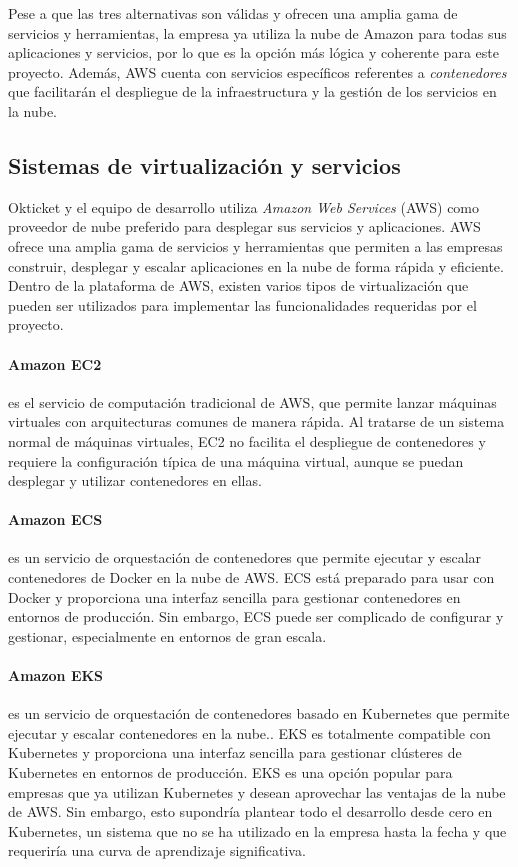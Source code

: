 Pese a que las tres alternativas son válidas y ofrecen una amplia gama de
servicios y herramientas, la empresa ya utiliza la nube de Amazon para todas sus
aplicaciones y servicios, por lo que es la opción más lógica y coherente para
este proyecto. Además, AWS cuenta con servicios específicos referentes a
\textit{contenedores} que facilitarán el despliegue de la infraestructura y la
gestión de los servicios en la nube.


\newpage{}
\subsection{Sistemas de virtualización y servicios}\label{subsec:alt_servicios}
Okticket y el equipo de desarrollo utiliza \textit{Amazon Web Services} (AWS)
como proveedor de nube preferido para desplegar sus servicios y aplicaciones.
AWS ofrece una amplia gama de servicios y herramientas que permiten a las
empresas construir, desplegar y escalar aplicaciones en la nube de forma rápida
y eficiente. Dentro de la plataforma de AWS, existen varios tipos de
virtualización que pueden ser utilizados para implementar las funcionalidades
requeridas por el proyecto.

\paragraph{Amazon EC2} es el servicio de computación tradicional de AWS, que
permite lanzar máquinas virtuales con arquitecturas comunes de manera rápida.
Al tratarse de un sistema normal de máquinas virtuales, EC2 no facilita el
despliegue de contenedores y requiere la configuración típica de una máquina
virtual, aunque se puedan desplegar y utilizar contenedores en ellas.

\paragraph{Amazon ECS} es un servicio de orquestación de contenedores que
permite ejecutar y escalar contenedores de Docker en la nube de AWS. ECS está
preparado para usar con Docker y proporciona una interfaz sencilla para
gestionar contenedores en entornos de producción. Sin embargo, ECS puede ser
complicado de configurar y gestionar, especialmente en entornos de gran escala.

\paragraph{Amazon EKS} es un servicio de orquestación de contenedores basado
en Kubernetes que permite ejecutar y escalar contenedores en la nube.. EKS es
totalmente compatible con Kubernetes y proporciona una interfaz sencilla para
gestionar clústeres de Kubernetes en entornos de producción. EKS es una opción
popular para empresas que ya utilizan Kubernetes y desean aprovechar las
ventajas de la nube de AWS. Sin embargo, esto supondría plantear todo el
desarrollo desde cero en Kubernetes, un sistema que no se ha utilizado en la
empresa hasta la fecha y que requeriría una curva de aprendizaje significativa.

